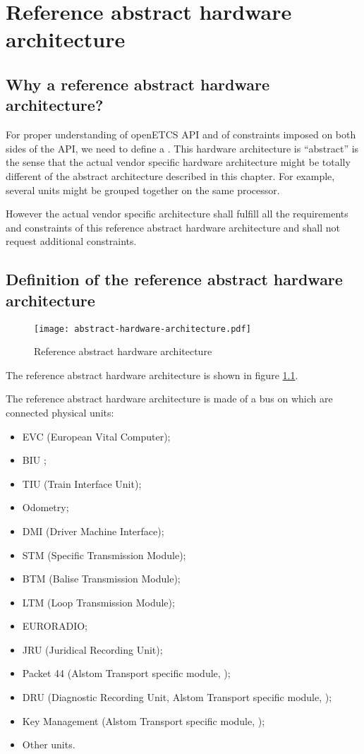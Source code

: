 \chapter{Reference abstract hardware architecture}

\section{Why a reference abstract hardware architecture?}

For proper understanding of openETCS API and of constraints imposed on
both sides of the API, we need to define a . This hardware architecture is ``abstract''
is the sense that the actual vendor specific hardware architecture
might be totally different of the abstract architecture described in
this chapter. For example, several units might be grouped together on
the same processor.

However the actual vendor specific architecture shall fulfill all the
requirements and constraints of this reference abstract hardware
architecture and shall not request additional constraints.

\section{Definition of the reference abstract hardware architecture}

\begin{figure}
  \centering
  \texttt{[image: abstract-hardware-architecture.pdf]}
  \caption{Reference abstract hardware architecture}
  \label{fig:hardware-arch}
\end{figure}

The reference abstract hardware architecture is shown in figure
\ref{fig:hardware-arch}.

The reference abstract hardware architecture is made of a bus on which
are connected physical units:
\begin{itemize}
\item EVC (European Vital Computer);
\item BIU ;
\item TIU (Train Interface Unit);
\item Odometry;
\item DMI (Driver Machine Interface);
\item STM (Specific Transmission Module);
\item BTM (Balise Transmission Module);
\item LTM (Loop Transmission Module);
\item EURORADIO;
\item JRU (Juridical Recording Unit);
\item Packet 44 (Alstom Transport specific module, \cite{alstom-api});
\item DRU (Diagnostic Recording Unit, Alstom Transport specific
  module, \cite{alstom-api});
\item Key Management (Alstom Transport specific module,
  \cite{alstom-api});
\item Other units.
\end{itemize}

